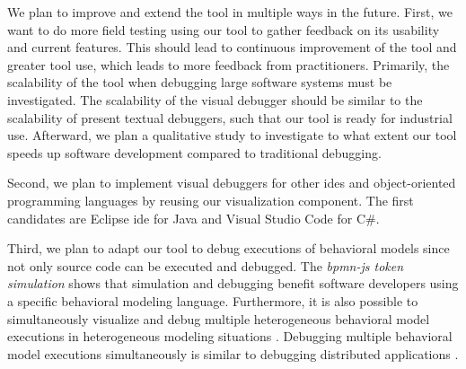 \documentclass[conference]{IEEEtran}
\begin{document}
We plan to improve and extend the tool in multiple ways in the future.
First, we want to do more field testing using our tool to gather feedback on its usability and current features.
This should lead to continuous improvement of the tool and greater tool use, which leads to more feedback from practitioners. 
Primarily, the scalability of the tool when debugging large software systems must be investigated.
The scalability of the visual debugger should be similar to the scalability of present textual debuggers, such that our tool is ready for industrial use.
Afterward, we plan a qualitative study to investigate to what extent our tool speeds up software development compared to traditional debugging.

Second, we plan to implement visual debuggers for other \glspl*{ide} and object-oriented programming languages by reusing our visualization component.
The first candidates are Eclipse \gls*{ide} for Java and Visual Studio Code for C\#.

Third, we plan to adapt our tool to debug executions of behavioral models since not only source code can be executed and debugged.
The \textit{bpmn-js token simulation} shows that simulation and debugging benefit software developers using a specific behavioral modeling language.
Furthermore, it is also possible to simultaneously visualize and debug multiple heterogeneous behavioral model executions in heterogeneous modeling situations \cite{krauterBehavioralConsistencyHeterogeneous2021}.
Debugging multiple behavioral model executions simultaneously is similar to debugging distributed applications \cite{kochGraphicalDebuggingDistributed2015}.


\end{document}
